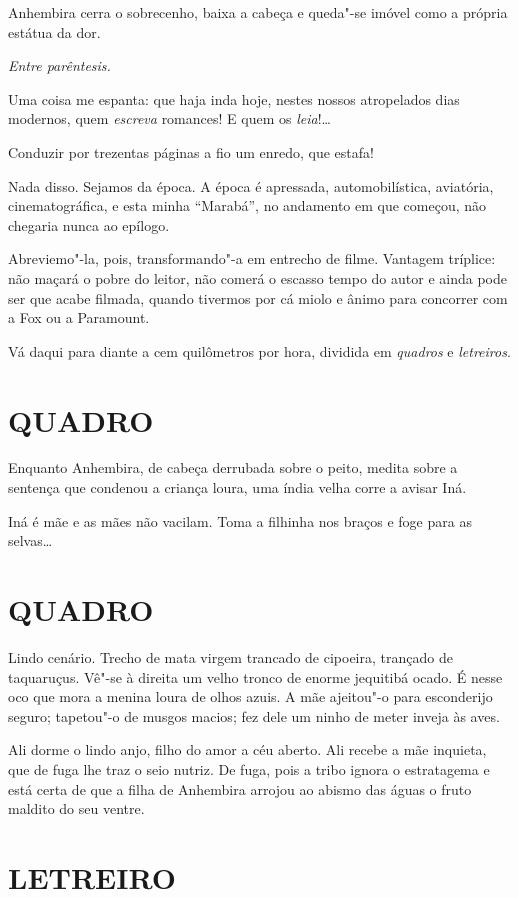 Anhembira cerra o sobrecenho, baixa a cabeça e queda"-se imóvel como a
própria estátua da dor.

\emph{Entre parêntesis.}

Uma coisa me espanta: que haja inda hoje, nestes nossos atropelados dias
modernos, quem \emph{escreva} romances! E quem os \emph{leia}!\ldots{}

Conduzir por trezentas páginas a fio um enredo, que estafa!

Nada disso. Sejamos da época. A época é apressada, automobilística,
aviatória, cinematográfica, e esta minha ``Marabá'', no andamento em que
começou, não chegaria nunca ao epílogo.

Abreviemo"-la, pois, transformando"-a em entrecho de filme. Vantagem
tríplice: não maçará o pobre do leitor, não comerá o escasso tempo do
autor e ainda pode ser que acabe filmada, quando tivermos por cá miolo e
ânimo para concorrer com a Fox ou a Paramount.

Vá daqui para diante a cem quilômetros por hora, dividida em
\emph{quadros} e \emph{letreiros}.

\section*{QUADRO}

Enquanto Anhembira, de cabeça derrubada sobre o peito, medita sobre a
sentença que condenou a criança loura, uma índia velha corre a avisar
Iná.

Iná é mãe e as mães não vacilam. Toma a filhinha nos braços e foge para
as selvas\ldots{}

\section*{QUADRO}

Lindo cenário. Trecho de mata virgem trancado de cipoeira, trançado de
taquaruçus. Vê"-se à direita um velho tronco de enorme jequitibá ocado. É
nesse oco que mora a menina loura de olhos azuis. A mãe ajeitou"-o para
esconderijo seguro; tapetou"-o de musgos macios; fez dele um ninho de
meter inveja às aves.

Ali dorme o lindo anjo, filho do amor a céu aberto. Ali recebe a mãe
inquieta, que de fuga lhe traz o seio nutriz. De fuga, pois a tribo
ignora o estratagema e está certa de que a filha de Anhembira arrojou ao
abismo das águas o fruto maldito do seu ventre.

\section*{LETREIRO}

